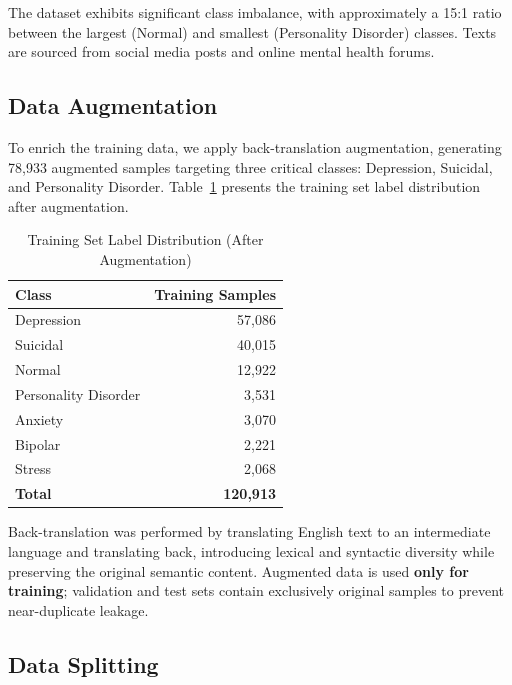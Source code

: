 \documentclass[conference, 10pt]{IEEEtran}
\begin{document}
The dataset exhibits significant class imbalance, with approximately a 15:1 ratio between the largest (Normal) and smallest (Personality Disorder) classes. Texts are sourced from social media posts and online mental health forums.

\subsection{Data Augmentation}

To enrich the training data, we apply back-translation augmentation, generating 78,933 augmented samples targeting three critical classes: Depression, Suicidal, and Personality Disorder. Table~\ref{tab:augmented} presents the training set label distribution after augmentation.

\begin{table}[t]
    \centering
    \caption{Training Set Label Distribution (After Augmentation)}
    \label{tab:augmented}
    \begin{tabular}{lr}
        \toprule
        \textbf{Class} & \textbf{Training Samples} \\
        \midrule
        Depression           & 57,086 \\
        Suicidal             & 40,015 \\
        Normal               & 12,922 \\
        Personality Disorder &  3,531 \\
        Anxiety              &  3,070 \\
        Bipolar              &  2,221 \\
        Stress               &  2,068 \\
        \midrule
        \textbf{Total}       & \textbf{120,913} \\
        \bottomrule
    \end{tabular}
\end{table}

Back-translation was performed by translating English text to an intermediate language and translating back, introducing lexical and syntactic diversity while preserving the original semantic content. Augmented data is used \textbf{only for training}; validation and test sets contain exclusively original samples to prevent near-duplicate leakage.

\subsection{Data Splitting}
\end{document}
